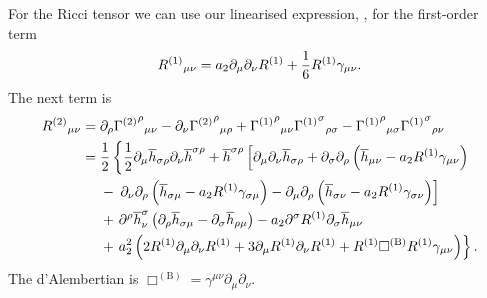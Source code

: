 For the Ricci tensor we can use our linearised expression, , for the first-order term
\begin{equation}
{R^{(1)}}_{\mu\nu} = a_2\partial_\mu\partial_\nu R^{(1)} + \frac{1}{6} R^{(1)}\gamma_{\mu\nu}.
\end{equation}
The next term is
\begin{align}
{R^{(2)}}_{\mu\nu} = {} & \partial_\rho {{\Gamma^{(2)}}^\rho}_{\mu\nu} - \partial_\nu {{\Gamma^{(2)}}^\rho}_{\mu\rho} + {{\Gamma^{(1)}}^\rho}_{\mu\nu}{{\Gamma^{(1)}}^\sigma}_{\rho\sigma} - {{\Gamma^{(1)}}^\rho}_{\mu\sigma}{{\Gamma^{(1)}}^\sigma}_{\rho\nu} \nonumber \\
 = {} & \frac{1}{2}\left\{\recip{2}\partial_\mu\overline{h}_{\sigma\rho}\partial_\nu\overline{h}^{\sigma\rho} + \overline{h}^{\sigma\rho}\left[\partial_\mu\partial_\nu\overline{h}_{\sigma\rho} \vphantom{R^{(1)}} + \partial_\sigma\partial_\rho\left(\overline{h}_{\mu\nu} - a_2 R^{(1)}\gamma_{\mu\nu}\right) \right.\right. \nonumber \\*
  & - \left.\left. \partial_\nu\partial_\rho\left(\overline{h}_{\sigma\mu} \vphantom{R^{(1)}} - a_2 R^{(1)} \gamma_{\sigma\mu}\right) - \partial_\mu\partial_\rho\left(\overline{h}_{\sigma\nu} - a_2 R^{(1)} \gamma_{\sigma\nu}\right)\right] \right. \nonumber \\*
  & + \left. \partial^\rho\overline{h}^\sigma_\nu\left(\partial_\rho\overline{h}_{\sigma\mu} - \partial_\sigma\overline{h}_{\rho\mu}\right) - a_2 \partial^\sigma R^{(1)}\partial_\sigma\overline{h}_{\mu\nu} \right. \nonumber \\*
  & + \left. a_2^2 \left(2R^{(1)}\partial_\mu\partial_\nu R^{(1)} + 3\partial_\mu R^{(1)}\partial_\nu R^{(1)} + R^{(1)} \Box^{(\text{B})} R^{(1)} \gamma_{\mu\nu}\right)\right\}.
\end{align}
The d'Alembertian is $\Box^{(\text{B})} = \gamma^{\mu\nu}\partial_\mu\partial_\nu$.

